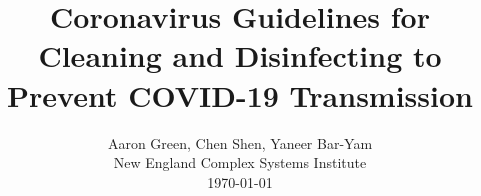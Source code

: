 \documentclass[onecolumn,journal]{IEEEtran}
\begin{document}
\title{\color{Brown} Coronavirus Guidelines for Cleaning and Disinfecting to Prevent COVID-19 Transmission\\
\vspace{-0.35ex}}
\author{Aaron Green, Chen Shen, Yaneer Bar-Yam \\ New England Complex Systems Institute \\
 \today 
  \vspace{-14ex} \\ 

   
\bigskip
\bigskip

\textbf{}
 }
    
\maketitle


\flushbottom %



\thispagestyle{empty} %




\renewcommand{\thefootnote}{\fnsymbol{footnote}}
\end{document}
